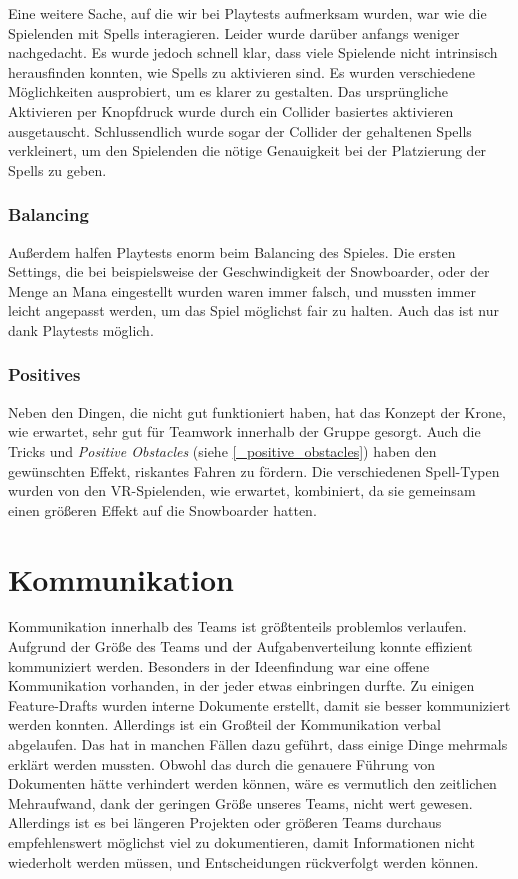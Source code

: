 Eine weitere Sache, auf die wir bei Playtests aufmerksam wurden, war wie die Spielenden mit Spells interagieren. Leider wurde darüber anfangs weniger nachgedacht. Es wurde jedoch schnell klar, dass viele Spielende nicht intrinsisch herausfinden konnten, wie Spells zu aktivieren sind. Es wurden verschiedene Möglichkeiten ausprobiert, um es klarer zu gestalten. Das ursprüngliche Aktivieren per Knopfdruck wurde durch ein Collider basiertes aktivieren ausgetauscht. Schlussendlich wurde sogar der Collider der gehaltenen Spells verkleinert, um den Spielenden die nötige Genauigkeit bei der Platzierung der Spells zu geben.

\subsubsection{Balancing}

Außerdem halfen Playtests enorm beim Balancing des Spieles. Die ersten Settings, die bei beispielsweise der Geschwindigkeit der Snowboarder, oder der Menge an Mana eingestellt wurden waren immer falsch, und mussten immer leicht angepasst werden, um das Spiel möglichst fair zu halten. Auch das ist nur dank Playtests möglich.

\subsubsection{Positives}

Neben den Dingen, die nicht gut funktioniert haben, hat das Konzept der Krone, wie erwartet, sehr gut für Teamwork innerhalb der Gruppe gesorgt. Auch die Tricks und \emph{Positive Obstacles} (siehe \ref{_positive_obstacles}) haben den gewünschten Effekt, riskantes Fahren zu fördern. Die verschiedenen Spell-Typen wurden von den VR-Spielenden, wie erwartet, kombiniert, da sie gemeinsam einen größeren Effekt auf die Snowboarder hatten.

\section{Kommunikation}
Kommunikation innerhalb des Teams ist größtenteils problemlos verlaufen. Aufgrund der Größe des Teams und der Aufgabenverteilung konnte effizient kommuniziert werden. Besonders in der Ideenfindung war eine offene Kommunikation vorhanden, in der jeder etwas einbringen durfte. Zu einigen Feature-Drafts wurden interne Dokumente erstellt, damit sie besser kommuniziert werden konnten. Allerdings ist ein Großteil der Kommunikation verbal abgelaufen. Das hat in manchen Fällen dazu geführt, dass einige Dinge mehrmals erklärt werden mussten. Obwohl das durch die genauere Führung von Dokumenten hätte verhindert werden können, wäre es vermutlich den zeitlichen Mehraufwand, dank der geringen Größe unseres Teams, nicht wert gewesen. Allerdings ist es bei längeren Projekten oder größeren Teams durchaus empfehlenswert möglichst viel zu dokumentieren, damit Informationen nicht wiederholt werden müssen, und Entscheidungen rückverfolgt werden können.

